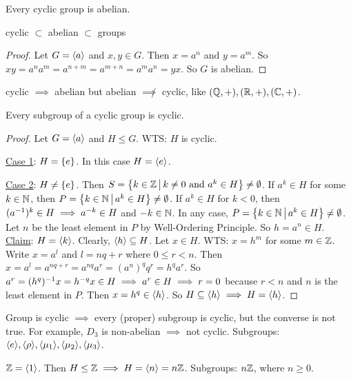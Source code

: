 \documentclass[]{article}
\begin{document}
\newpage
\begin{proposition}
	Every cyclic group is abelian.
\end{proposition}
\begin{note}
	cyclic $\subset$ abelian $\subset$ groups
\end{note}
\begin{proof}
	Let $G =\langle a \rangle$ and $x,y\in G$. Then $x = a^n$ and $y = a^m$. So $xy = a^na^m = a^{n+m} = a^{m+n} = a^ma^n = yx$. So $G$ is abelian.
\end{proof}
\begin{remark}
	cyclic $\implies$ abelian but abelian $\not\implies$ cyclic, like $(\mathbb{Q},+),(\mathbb{R},+), (\mathbb{C},+)$.
\end{remark}

\begin{theorem}
	Every subgroup of a cyclic group is cyclic.
\end{theorem}
\begin{proof}
	Let $G =\langle a \rangle$ and $H\leq G$.
	WTS: $H$ is cyclic.
	
	\ul{Case 1}: $H = \left\{ e \right\}$. In this case $H = \langle e \rangle$.

	\ul{Case 2}: $H\neq \left\{ e \right\}$.
	Then $S = \left\{ k\in \mathbb{Z} \, \middle| \, k \neq 0 \text{ and } a^k\in H \right\}\neq \emptyset$.
	If $a^k\in H$ for some $k\in\mathbb{N}$, then $P = \left\{ k\in\mathbb{N} \, \middle| \, a^k\in H \right\}\neq\emptyset$.
	If $a^k\in H$ for $k<0$, then $(a^{-1})^k\in H\implies a^{-k}\in H$ and $-k\in\mathbb{N}$.
	In any case, $P = \left\{ k\in\mathbb{N} \, \middle| \, a^k\in H \right\}\neq \emptyset$.
	Let $n$ be the least element in $P$ by Well-Ordering Principle.
	So $h = a^n\in H$. \ul{Claim}: $H =\langle k \rangle$.
	Clearly, $\langle h \rangle \subseteq H$. Let $x\in H$. WTS: $x = h^m$ for some $m\in\mathbb{Z}$.
	Write $x = a^l$ and $l = nq + r$ where $0\leq r<n$. Then $x = a^l = a^{nq+r} = a^{nq} a^r = (a^n)^qq^r = h^qa^r$. So $a^r = (h^q)^{-1} x = h^{-q}x\in H \implies a^r\in H \implies r = 0$ because $r<n$ and $n$ is the least element in $P$.
	Then $x = h^q \in\langle h \rangle$. So $H\subseteq\langle h \rangle \implies H =\langle h \rangle$.
\end{proof}

Group is cyclic $\implies$ every (proper) subgroup is cyclic, but the converse is not true. For example, $D_3$ is non-abelian $\implies$ not cyclic. Subgroups: $\langle e \rangle,\langle \rho \rangle,\langle \mu_1 \rangle,\langle \mu_2 \rangle,\langle \mu_3 \rangle$.

\begin{example}
	$\mathbb{Z} =\langle 1 \rangle$. Then $H\leq \mathbb{Z} \implies H =\langle n \rangle = n\mathbb{Z}$. Subgroups: $n\mathbb{Z}$, where $n\geq 0$.
\end{example}
\end{document}
